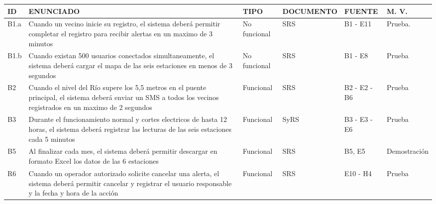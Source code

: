 \documentclass[conference,onecolumn]{IEEEtran}
\begin{document}
{\small
\setlength{\tabcolsep}{3pt}
\begin{longtable}{@{}L{0.06\textwidth}L{0.38\textwidth}L{0.11\textwidth}L{0.11\textwidth}L{0.12\textwidth}L{0.14\textwidth}@{}}
\toprule
\textbf{ID} & \textbf{ENUNCIADO} & \textbf{TIPO} & \textbf{DOCUMENTO} & \textbf{FUENTE} & \textbf{M. V.}\\
\midrule
\endhead
B1.a & Cuando un vecino inicie su registro, el sistema deberá permitir completar el registro para recibir alertas en un maximo de 3 minutos & No funcional & SRS & B1 - E11 & Prueba.\\
B1.b & Cuando existan 500 usuarios conectados simultaneamente, el sistema deberá cargar el mapa de las seis estaciones en menos de 3 segundos & No funcional & SRS & B1 - E8 & Prueba\\
B2 & Cuando el nivel del Río supere los 5,5 metros en el puente principal, el sistema deberá enviar un SMS a todos los vecinos registrados en un maximo de 2 segundos & Funcional & SRS & B2 - E2 - B6 & Prueba\\
B3 & Durante el funcionamiento normal y cortes electricos de hasta 12 horas, el sistema deberá registrar las lecturas de las seis estaciones cada 5 minutos & Funcional & SyRS & B3 - E3 - E6 & Prueba\\
B5 & Al finalizar cada mes, el sistema deberá permitir descargar en formato Excel los datos de las 6 estaciones & Funcional & SRS & B5, E5 & Demostración\\
R6 & Cuando un operador autorizado solicite cancelar una alerta, el sistema deberá permitir cancelar y registrar el usuario responsable y la fecha y hora de la acción & Funcional & SRS & E10 - H4 & Prueba\\
\bottomrule
\end{longtable}
}
\end{document}
